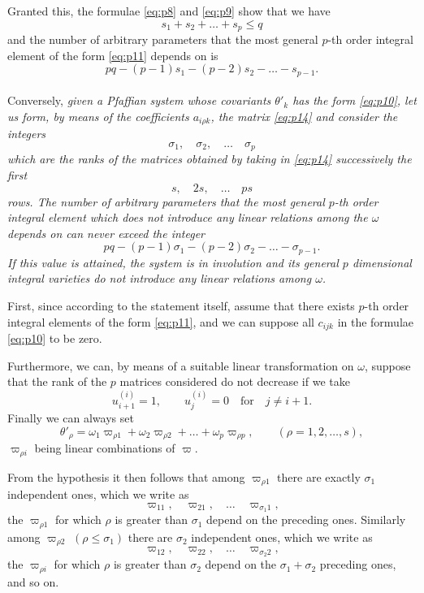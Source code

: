 \documentclass[leqno,11pt]{book}
\theoremstyle{shape1}
\theoremstyle{shapesmall}
\newcommand{\vp}{\varpi}
\newcommand{\somespace}{\vspace{9pt}}
\begin{document}
Granted this, the formulae \eqref{eq:p8} and \eqref{eq:p9} show that we have
\[
s_{1}+s_{2}+\dots+s_{p}\le q
\]
and the number of arbitrary parameters that the most general $p$-th order integral element of the form \eqref{eq:p11} depends on is
\[
pq-(p-1)s_{1}-(p-2)s_{2}-\dots-s_{p-1}.
\]

\paragraph{}
\label{sec:p6}
Conversely, \emph{given a Pfaffian system whose covariants $\theta'_{k}$ has the form \eqref{eq:p10}, let us form, by means of the coefficients $a_{i\rho k}$, the matrix \eqref{eq:p14} and consider the integers}
\[
\sigma_{1},\quad\sigma_{2},\quad\dots\quad\sigma_{p}
\]
\emph{which are the ranks of the matrices obtained by taking in \eqref{eq:p14} successively the first}
\[
s,\quad 2s,\quad\dots\quad ps
\]
\emph{rows. The number of arbitrary parameters that the most general $p$-th order integral element which does not introduce any linear relations among the $\omega$ depends on can never exceed the integer}
\[
pq-(p-1)\sigma_{1}-(p-2)\sigma_{2}-\dots-\sigma_{p-1}.
\]
\emph{If this value is attained, the system is in involution and its general $p$ dimensional integral varieties do not introduce any linear relations among $\omega$.}

\somespace

First, since according to the statement itself, assume that there exists $p$-th order integral elements of the form \eqref{eq:p11}, and we can suppose all $c_{ijk}$ in the formulae \eqref{eq:p10} to be zero.

Furthermore, we can, by means of a suitable linear transformation on $\omega$, suppose that the rank of the $p$ matrices considered do not decrease if we take
\[
u^{(i)}_{i+1}=1,\qquad u^{(i)}_{j}=0\quad\text{for}\quad j\neq i+1.
\]
Finally we can always set
\begin{equation}
  \label{eq:p15}
  \theta'_{\rho}=\omega_{1}\vp_{\rho 1}+\omega_{2}\vp_{\rho 2}+\dots+\omega_{p}\vp_{\rho p},\qquad(\rho=1,2,\dots,s),
\end{equation}
$\vp_{\rho i}$ being linear combinations of $\vp$.

From the hypothesis it then follows that among $\vp_{\rho 1}$ there are exactly $\sigma_{1}$ independent ones, which we write as
\[
\vp_{11},\quad\vp_{21},\quad\dots\quad\vp_{\sigma_{1}1},
\]
the $\vp_{\rho 1}$ for which $\rho$ is greater than $\sigma_{1}$ depend on the preceding ones. Similarly among $\vp_{\rho 2}$ $(\rho\le \sigma_{1})$ there are $\sigma_{2}$ independent ones, which we write as
\[
\vp_{12},\quad\vp_{22},\quad\dots\quad\vp_{\sigma_{2}2},
\]
the $\vp_{\rho i}$ for which $\rho$ is greater than $\sigma_{2}$ depend on the $\sigma_{1}+\sigma_{2}$ preceding ones, and so on.
\end{document}
